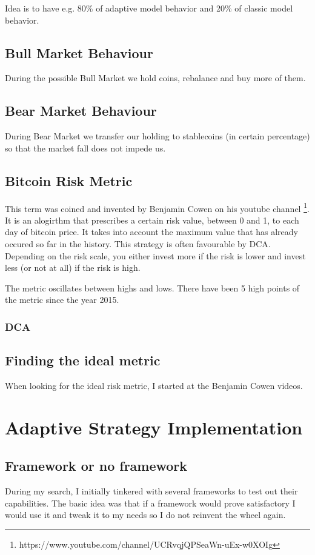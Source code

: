 Idea is to have e.g. 80\% of adaptive model behavior and 20\% of classic model behavior.

\section{Bull Market Behaviour}
During the possible Bull Market we hold coins, rebalance and buy more of them.

\section{Bear Market Behaviour}
During Bear Market we transfer our holding to stablecoins (in certain percentage) so that the market fall does not impede us.

\section{Bitcoin Risk Metric}
This term was coined and invented by Benjamin Cowen on his youtube channel \footnote{https://www.youtube.com/channel/UCRvqjQPSeaWn-uEx-w0XOIg}. It is an alogirthm that prescribes a certain risk value, between 0 and 1, to each day of bitcoin price. It takes into account the maximum value that has already occured so far in the history. This strategy is often favourable by DCA. Depending on the risk scale, you either invest more if the risk is lower and invest less (or not at all) if the risk is high.

The metric oscillates between highs and lows. There have been 5 high points of the metric since the year 2015.

\subsection*{DCA}

\section{Finding the ideal metric}
When looking for the ideal risk metric, I started at the Benjamin Cowen videos.

\chapter{Adaptive Strategy Implementation}
\label{implementation}

\section{Framework or no framework}
During my search, I initially tinkered with several frameworks to test out their capabilities. The basic idea was that if a framework would prove satisfactory I would use it and tweak it to my needs so I do not reinvent the wheel again.

